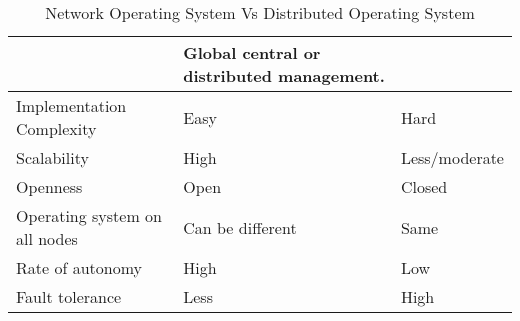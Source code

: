 \begin{table}[H]
\begin{tabular}{p{3cm}|p{7cm}|p{7cm}}
         & Global central or distributed management.
         \\ \hline
         Implementation Complexity
         & Easy
         & Hard
         \\ \hline
         Scalability 
         & High
         & Less/moderate
         \\ \hline
         Openness 
         & Open
         & Closed
         \\ \hline
         Operating system on all nodes 
         & Can be different
         & Same
         \\ \hline
         Rate of autonomy  
         & High
         & Low
         \\ \hline
         Fault tolerance
         & Less
         & High
         \\ \hline
    \end{tabular}
    \caption{Network Operating System Vs Distributed Operating System}
    \label{tab:NetworkOSvsDistributedOS}
\end{table}

